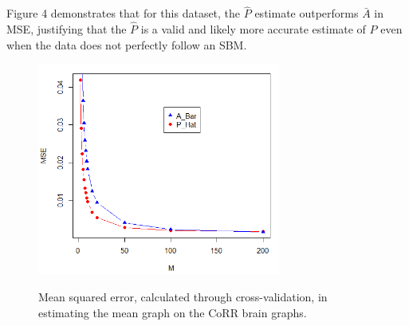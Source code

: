 	Figure 4 demonstrates that for this dataset, the $\hat{P}$ estimate outperforms $\bar{A}$ in MSE, justifying that the $\hat{P}$ is a valid and likely more accurate estimate of $P$ even when the data does not perfectly follow an SBM.
	
	\begin{figure}[!htb]
		\centering
		\includegraphics[width=8cm]{XV_MSE.PNG}
		\label{fig:plot1}
		\caption{Mean squared error, calculated through cross-validation, in estimating the mean graph on the CoRR brain graphs.}
	\end{figure} 
\newpage